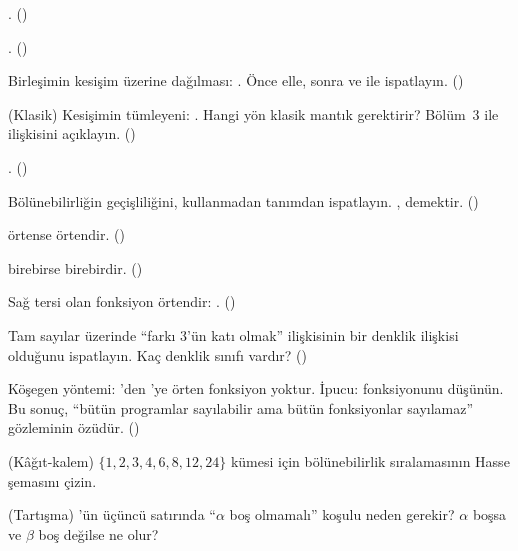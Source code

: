\begin{alistirmalar}
 . ()

 . ()

 Birleşimin kesişim üzerine dağılması:
. Önce elle, sonra 
ve  ile ispatlayın. ()

\label{alis:kume-demorgan} (Klasik) Kesişimin tümleyeni:
. Hangi yön klasik mantık gerektirir? Bölüm~3 ile
ilişkisini açıklayın. ()

 . ()

 Bölünebilirliğin geçişliliğini,  kullanmadan
tanımdan ispatlayın. ,  demektir.
()

  örtense  örtendir. ()

  birebirse  birebirdir. ()

\label{alis:sag-ters} Sağ tersi olan fonksiyon örtendir:
. ()

 Tam sayılar üzerinde ``farkı 3'ün katı olmak''
ilişkisinin bir denklik ilişkisi olduğunu ispatlayın. Kaç denklik sınıfı
vardır? ()

 Köşegen yöntemi: 'den 'ye örten fonksiyon
yoktur. İpucu:  fonksiyonunu düşünün. Bu sonuç,
``bütün programlar sayılabilir ama bütün fonksiyonlar sayılamaz''
gözleminin özüdür. ()

 (Kâğıt-kalem) $\{1, 2, 3, 4, 6, 8, 12, 24\}$ kümesi için
bölünebilirlik sıralamasının Hasse şemasını çizin.

 (Tartışma) 'ün üçüncü satırında
``$\alpha$ boş olmamalı'' koşulu neden gerekir? $\alpha$ boşsa ve
$\beta$ boş değilse ne olur?
\end{alistirmalar}
